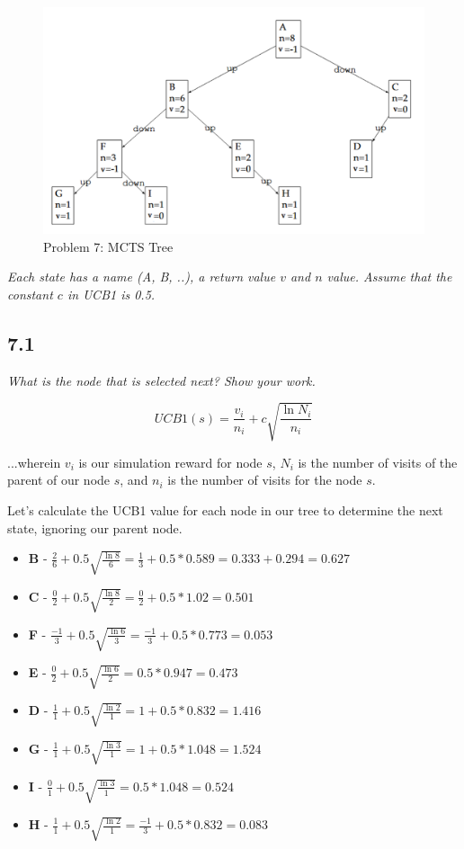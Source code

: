 \documentclass{article}
\begin{document}
\begin{figure}
    \centering
    \includegraphics[width=.8\linewidth]{imgs/midterm.7.png}
    \caption{Problem 7: MCTS Tree}
\end{figure}

\textit{Each state has a name (A, B, ..), a return value $v$ and $n$ value. Assume that the constant $c$ in UCB1 is 0.5.}

\subsection*{7.1}

\textit{What is the node that is selected next? Show your work.}

\begin{equation}
    UCB1(s) = \frac{v_i}{n_i}+ c \sqrt{\frac{\ln{N_i}}{n_i}}
\end{equation}

...wherein $v_i$ is our simulation reward for node $s$, $N_i$ is the number of visits of the parent of our node $s$, and $n_i$ is the number of visits for the node $s$.

Let's calculate the UCB1 value for each node in our tree to determine the next state, ignoring our parent node.

\begin{itemize}
    \item \textbf{B} - $\frac{2}{6}+ 0.5 \sqrt{\frac{\ln{8}}{6}} = \frac{1}{3} + 0.5 * 0.589 = 0.333 + 0.294 = 0.627$
    \item \textbf{C} - $\frac{0}{2}+ 0.5 \sqrt{\frac{\ln{8}}{2}} = \frac{0}{2} + 0.5 * 1.02 = 0.501$
    \item \textbf{F} - $\frac{-1}{3}+ 0.5 \sqrt{\frac{\ln{6}}{3}} = \frac{-1}{3} + 0.5 * 0.773 = 0.053$
    \item \textbf{E} - $\frac{0}{2}+ 0.5 \sqrt{\frac{\ln{6}}{2}} = 0.5 * 0.947 = 0.473$
    \item \textbf{D} - $\frac{1}{1}+ 0.5 \sqrt{\frac{\ln{2}}{1}} = 1 + 0.5 * 0.832 = 1.416$
    \item \textbf{G} - $\frac{1}{1}+ 0.5 \sqrt{\frac{\ln{3}}{1}} = 1 + 0.5 * 1.048 = 1.524$
    \item \textbf{I} - $\frac{0}{1}+ 0.5 \sqrt{\frac{\ln{3}}{1}} = 0.5 * 1.048 = 0.524$
    \item \textbf{H} - $\frac{1}{1}+ 0.5 \sqrt{\frac{\ln{2}}{1}} = \frac{-1}{3} + 0.5 * 0.832 = 0.083$
\end{itemize}
\end{document}
